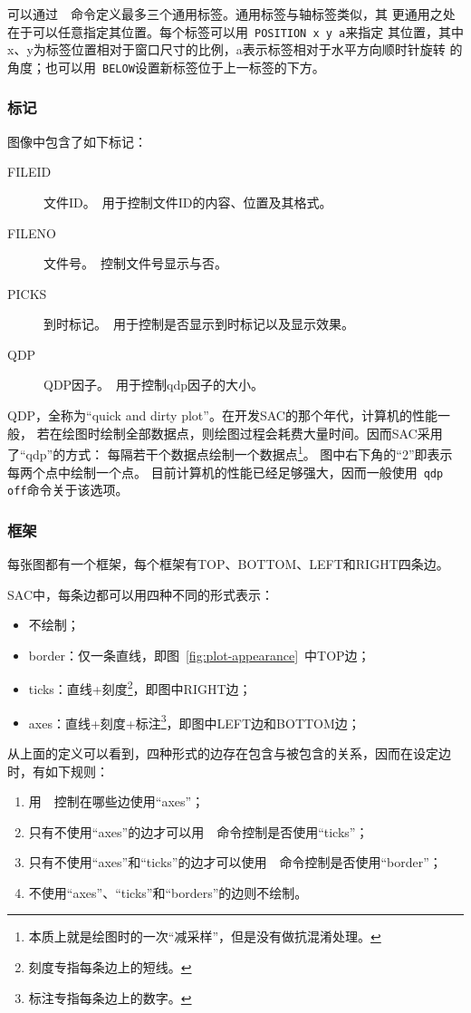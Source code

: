 可以通过~~命令定义最多三个通用标签。通用标签与轴标签类似，其
更通用之处在于可以任意指定其位置。每个标签可以用~\verb+POSITION x y a+来指定
其位置，其中x、y为标签位置相对于窗口尺寸的比例，a表示标签相对于水平方向顺时针旋转
的角度；也可以用~\verb+BELOW+设置新标签位于上一标签的下方。

\subsubsection{标记}
图像中包含了如下标记：
\begin{description}
\item [FILEID] 文件ID。~用于控制文件ID的内容、位置及其格式。
\item [FILENO] 文件号。~控制文件号显示与否。
\item [PICKS] 到时标记。~用于控制是否显示到时标记以及显示效果。
\item [QDP] QDP因子。~用于控制qdp因子的大小。
\end{description}

QDP，全称为``quick and dirty plot''。在开发SAC的那个年代，计算机的性能一般，
若在绘图时绘制全部数据点，则绘图过程会耗费大量时间。因而SAC采用了``qdp''的方式：
每隔若干个数据点绘制一个数据点\footnote{本质上就是绘图时的一次``减采样''，但是没有做抗混淆处理。}。
图中右下角的``2''即表示每两个点中绘制一个点。
目前计算机的性能已经足够强大，因而一般使用~\verb+qdp off+命令关于该选项。

\subsubsection{框架}
每张图都有一个框架，每个框架有TOP、BOTTOM、LEFT和RIGHT四条边。

SAC中，每条边都可以用四种不同的形式表示：
\begin{itemize}
\item 不绘制；
\item border：仅一条直线，即图~\ref{fig:plot-appearance}~中TOP边；
\item ticks：直线+刻度\footnote{刻度专指每条边上的短线。}，即图中RIGHT边；
\item axes：直线+刻度+标注\footnote{标注专指每条边上的数字。}，即图中LEFT边和BOTTOM边；
\end{itemize}

从上面的定义可以看到，四种形式的边存在包含与被包含的关系，因而在设定边时，有如下规则：
\begin{enumerate}
\item 用~~控制在哪些边使用``axes''；
\item 只有不使用``axes''的边才可以用~~命令控制是否使用``ticks''；
\item 只有不使用``axes''和``ticks''的边才可以使用~~命令控制是否使用``border''；
\item 不使用``axes''、``ticks''和``borders''的边则不绘制。
\end{enumerate}

